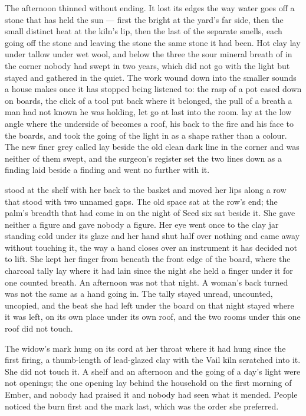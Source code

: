 The afternoon thinned without ending. It lost its edges the way water goes off a stone that has held the sun --- first the bright at the yard's far side, then the small distinct heat at the kiln's lip, then the last of the separate smells, each going off the stone and leaving the stone the same stone it had been. Hot clay lay under tallow under wet wool, and below the three the sour mineral breath of  in the corner nobody had swept in two years, which did not go with the light but stayed and gathered in the quiet. The work wound down into the smaller sounds a house makes once it has stopped being listened to: the rasp of a pot eased down on boards, the click of a tool put back where it belonged, the pull of a breath a man had not known he was holding, let go at last into the room.  lay at the low angle where the underside of  becomes a roof, his back to the fire and his face to the boards, and took the going of the light in as a shape rather than a colour. The new finer grey called  lay beside the old clean dark line in the corner and was neither of them swept, and the surgeon's register set the two lines down as a finding laid beside a finding and went no further with it.

 stood at the shelf with her back to the basket and moved her lips along a row that stood with two unnamed gaps. The old space sat at the row's end; the palm's breadth that had come in on the night of Seed six sat beside it. She gave neither a figure and gave nobody a figure. Her eye went once to the clay jar standing cold under its glaze and her hand shut half over nothing and came away without touching it, the way a hand closes over an instrument it has decided not to lift. She kept her finger from beneath the front edge of the board, where the charcoal tally lay where it had lain since the night she held a finger under it for one counted breath. An afternoon was not that night. A woman's back turned was not the same as a hand going in. The tally stayed unread, uncounted, uncopied, and the beat she had left under the board on that night stayed where it was left, on its own place under its own roof, and the two rooms under this one roof did not touch.

The widow's mark hung on its cord at her throat where it had hung since the first firing, a thumb-length of lead-glazed clay with the Vail kiln scratched into it. She did not touch it. A shelf and an afternoon and the going of a day's light were not openings; the one opening lay behind the household on the first morning of Ember, and nobody had praised it and nobody had seen what it mended. People noticed the burn first and the mark last, which was the order she preferred.


